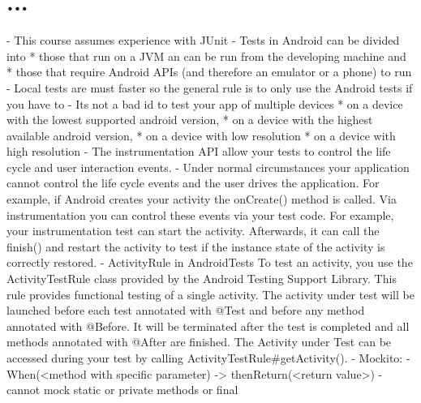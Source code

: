 \graphicspath{{./lab06/Images/}}


\maketocpage

\section{...}
- This course assumes experience with JUnit
- Tests in Android can be divided into 
	* those that run on a JVM an can be run from the developing machine and
	* those that require Android APIs (and therefore an emulator or a phone) to run
- Local tests are must faster so the general rule is to only use the Android tests if you have to
- Its not a bad id to test your app of multiple devices
	* on a device with the lowest supported android version,
	* on a device with the highest available android version,
	* on a device with low resolution
	* on a device with high resolution
- The instrumentation API allow your tests to control the life cycle and user interaction events.
- Under normal circumstances your application cannot control the life cycle events and the user drives the application. For example, if Android creates your activity the onCreate() method is called. Via instrumentation you can control these events via your test code. For example, your instrumentation test can start the activity. Afterwards, it can call the finish() and restart the activity to test if the instance state of the activity is correctly restored.
- ActivityRule in AndroidTests
	To test an activity, you use the ActivityTestRule class provided by the Android Testing Support Library. This rule provides functional testing of a single activity. The activity under test will be launched before each test annotated with @Test and before any method annotated with @Before. It will be terminated after the test is completed and all methods annotated with @After are finished. The Activity under Test can be accessed during your test by calling ActivityTestRule#getActivity().
- Mockito:
	- When(<method with specific parameter) -> thenReturn(<return value>)
	- cannot mock static or private methods or final



